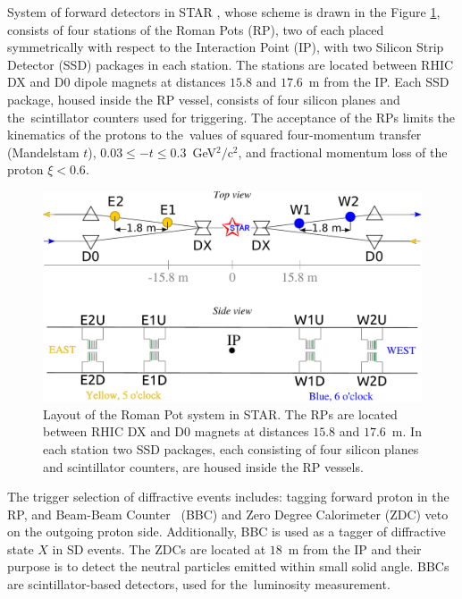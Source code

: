 System of forward detectors in STAR \cite{A_N}, whose scheme is drawn in the Figure \ref{fig:rpscheme}, consists of  four stations of the Roman Pots (RP), two of each placed symmetrically with respect to the Interaction Point (IP), with two Silicon Strip Detector (SSD) packages in each station. The stations are located between RHIC DX and D0 dipole magnets at distances $15.8$ and $17.6$~m from  the IP. Each SSD package, housed inside the RP vessel, consists of four silicon planes and the~scintillator counters used for triggering. The acceptance of the RPs limits the kinematics of the protons to the~values of squared four-momentum transfer (Mandelstam $t$), $0.03\leq -t \leq 0.3$~GeV$^2/$c$^{2}$, and fractional momentum loss of the proton $\xi<0.6$.

\begin{figure}[hb]
	\centering
	
	\includegraphics[width=\linewidth, page=1]{graphics/experimentalSetup/RP_phaseII_2.pdf}
	
	\caption[Layout of the Roman Pot system in STAR.]{ Layout of the Roman Pot system in STAR. The RPs are located between RHIC DX and D0 magnets  at distances $15.8$ and $17.6$~m. In each station two SSD packages, each consisting of four silicon planes and scintillator counters, are housed inside the RP vessels.}
	\label{fig:rpscheme}
\end{figure}

The trigger selection of diffractive events includes: tagging forward 
proton in the RP,  and Beam-Beam Counter~\cite{Kiryluk:2003aw} (BBC) and Zero Degree 
Calorimeter \cite{Adler:2000bd} (ZDC) veto on the outgoing proton side. Additionally, BBC is used as a tagger of diffractive state $X$ in SD events. The ZDCs are located at $18$~m from the IP and their purpose is to detect the neutral particles emitted within small solid angle. BBCs are scintillator-based detectors, used for the~luminosity measurement.


